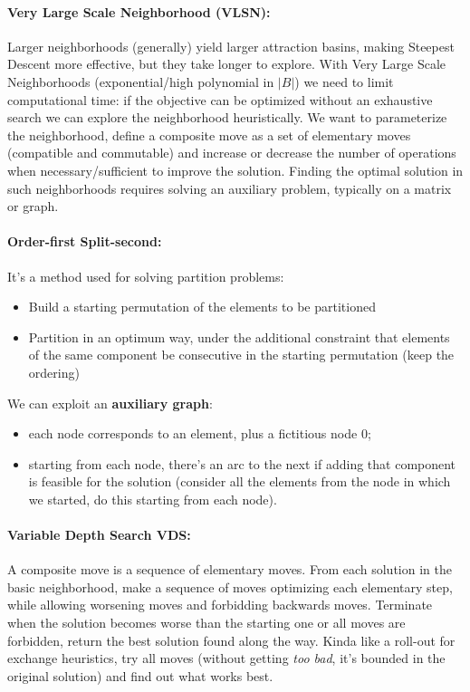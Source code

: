 \documentclass{article}
\begin{document}
	\paragraph{Very Large Scale Neighborhood (VLSN):} Larger neighborhoods (generally) yield larger attraction basins, making Steepest Descent more effective, but they take longer to explore. With Very Large Scale Neighborhoods (exponential/high polynomial in $|B|$) we need to limit computational time: if the objective can be optimized without an exhaustive search we can explore the neighborhood heuristically. We want to parameterize the neighborhood, define a composite move as a set of elementary moves (compatible and commutable) and increase or decrease the number of operations when necessary/sufficient to improve the solution. Finding the optimal solution in such neighborhoods requires solving an auxiliary problem, typically on a matrix or graph.\\
	
	\paragraph{Order-first Split-second:} It's a method used for solving partition problems:
	\begin{itemize}
		\item Build a starting permutation of the elements to be partitioned
		\item Partition in an optimum way, under the additional constraint that elements of the same component be consecutive in the starting permutation (keep the ordering)
	\end{itemize}
	We can exploit an \textbf{auxiliary graph}: 
	\begin{itemize}
		\item each node corresponds to an element, plus a fictitious node $0$;
		\item starting from each node, there's an arc to the next if adding that component is feasible for the solution (consider all the elements from the node in which we started, do this starting from each node).\\
	\end{itemize}
	
	\paragraph{Variable Depth Search VDS:} A composite move is a sequence of elementary moves. From each solution in the basic neighborhood, make a sequence of moves optimizing each elementary step, while allowing worsening moves and forbidding backwards moves. Terminate when the solution becomes worse than the starting one or all moves are forbidden, return the best solution found along the way. Kinda like a roll-out for exchange heuristics, try all moves (without getting \textit{too bad}, it's bounded in the original solution) and find out what works best.\\
	
\end{document}
